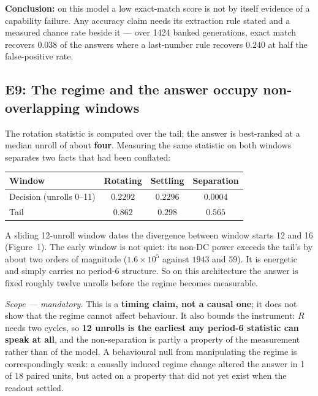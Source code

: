 \documentclass[11pt,a4paper]{article}
\begin{document}
\textbf{Conclusion:} on this model a low exact-match score is not by itself evidence of a
capability failure. Any accuracy claim needs its extraction rule stated and a measured chance rate
beside it --- over 1424 banked generations, exact match recovers $0.038$ of the answers where a
last-number rule recovers $0.240$ at half the false-positive rate.

\subsection*{E9: The regime and the answer occupy non-overlapping windows}

The rotation statistic is computed over the tail; the answer is best-ranked at a median unroll of
about \textbf{four}. Measuring the same statistic on both windows separates two facts that had
been conflated:

\begin{table}[h]
\centering
\small
\begin{tabular}{lccc}
\toprule
Window & Rotating & Settling & Separation \\
\midrule
Decision (unrolls 0--11) & $0.2292$ & $0.2296$ & $\mathbf{0.0004}$ \\
Tail                     & $0.862$  & $0.298$  & $\mathbf{0.565}$ \\
\bottomrule
\end{tabular}
\end{table}

A sliding 12-unroll window dates the divergence between window starts 12 and 16 (Figure~1). The
early window is not quiet: its non-DC power exceeds the tail's by about two orders of magnitude
($1.6\times10^{5}$ against $1943$ and $59$). It is energetic and simply carries no period-6
structure. So on this architecture the answer is fixed roughly twelve unrolls before the regime
becomes measurable.

\textit{Scope --- mandatory.} This is a \textbf{timing claim, not a causal one}; it does not show
that the regime cannot affect behaviour. It also bounds the instrument: $R$ needs two cycles, so
\textbf{12 unrolls is the earliest any period-6 statistic can speak at all}, and the
non-separation is partly a property of the measurement rather than of the model. A behavioural
null from manipulating the regime is correspondingly weak: a causally induced regime change
altered the answer in 1 of 18 paired units, but acted on a property that did not yet exist when
the readout settled.
\end{document}
